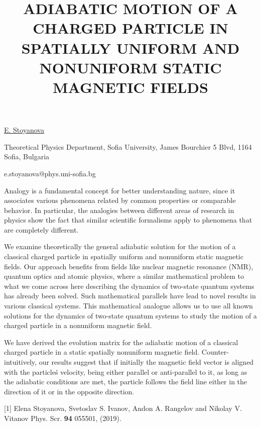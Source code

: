 \title{ADIABATIC MOTION OF A CHARGED PARTICLE IN SPATIALLY UNIFORM AND NONUNIFORM STATIC MAGNETIC FIELDS}

\underline{E. Stoyanova} 

{\normalsize{\vspace{-4mm}
Theoretical Physics Department, Sofia University, James Bourchier 5 Blvd, 1164 Sofia, Bulgaria



\email e.stoyanova@phys.uni-sofia.bg}}

Analogy is a fundamental concept for better understanding nature, since it associates various phenomena related by common properties or comparable behavior. In particular, the analogies between different areas of research in physics show the fact that similar scientific formalisms apply to phenomena that are completely different.

We examine theoretically the general adiabatic solution for the motion of a classical charged particle in spatially uniform and nonuniform static magnetic fields. Our approach benefits from fields like nuclear magnetic resonance (NMR), quantum optics and atomic physics, where a similar mathematical problem to what we come across here describing the dynamics of two-state quantum systems has already been solved. Such mathematical parallels have lead to novel results in various classical systems. This mathematical analogue allows us to use all known solutions for the dynamics of two-state quantum systems to study the motion of a charged particle in a nonuniform magnetic field.

We have derived the evolution matrix for the adiabatic motion of a classical charged particle in a static spatially nonuniform magnetic field. Counter-intuitively, our results suggest that if initially the magnetic field vector is aligned with the particle\'s velocity, being either parallel or anti-parallel to it, as long as the adiabatic conditions are met, the particle follows the field line either in the direction of it or in the opposite direction.

{\normalsize
[1] Elena Stoyanova, Svetoslav S. Ivanov, Andon A. Rangelov and Nikolay V. Vitanov  Phys. Scr. \textbf{94} 055501, (2019).
}

\vspace{\baselineskip}